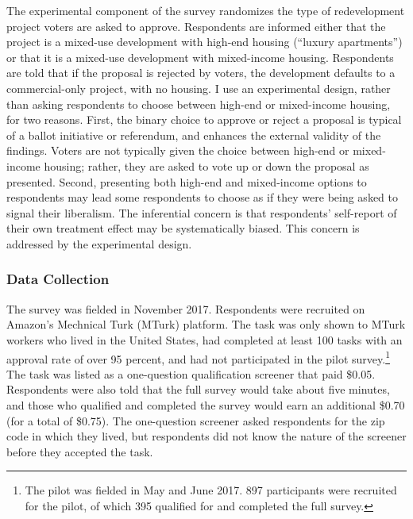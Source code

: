\documentclass[article,11pt]{memoir}
\begin{document}
The experimental component of the survey randomizes the type of redevelopment project voters are asked to approve.  Respondents are informed either that the project is a mixed-use development with high-end housing (``luxury apartments'') or that it is a mixed-use development with mixed-income housing.  Respondents are told that if the proposal is rejected by voters, the development defaults to a commercial-only project, with no housing.  I use an experimental design, rather than asking respondents to choose between high-end or mixed-income housing, for two reasons. First, the binary choice to approve or reject a proposal is typical of a ballot initiative or referendum, and enhances the external validity of the findings. Voters are not typically given the choice between high-end or mixed-income housing; rather, they are asked to vote up or down the proposal as presented. Second, presenting both high-end and mixed-income options to respondents may lead some respondents to choose as if they were being asked to signal their liberalism.  The inferential concern is that respondents' self-report of their own treatment effect may be systematically biased. This concern is addressed by the experimental design.

\subsubsection{Data Collection}

The survey was fielded in November 2017.  Respondents were recruited on Amazon's Mechnical Turk (MTurk) platform.  The task was only shown to MTurk workers who lived in the United States, had completed at least 100 tasks with an approval rate of over 95 percent, and had not participated in the pilot survey.\footnote{The pilot was fielded in May and June 2017. 897 participants were recruited for the pilot, of which 395 qualified for and completed the full survey.}  The task was listed as a one-question qualification screener that paid \$0.05. Respondents were also told that the full survey would take about five minutes, and those who qualified and completed the survey would earn an additional \$0.70 (for a total of \$0.75).  The one-question screener asked respondents for the zip code in which they lived, but respondents did not know the nature of the screener before they accepted the task.
\end{document}
